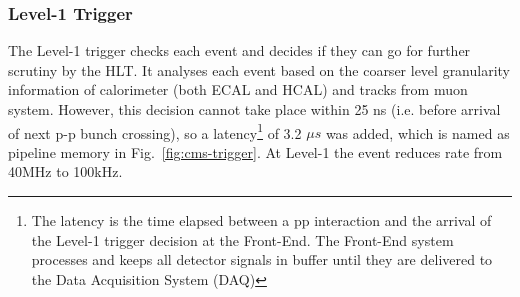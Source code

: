 \subsubsection{Level-1 Trigger} %
\label{ssub:level_1_trigger}
The Level-1 trigger checks each event and decides if they can go for further scrutiny by the HLT. It analyses each event based on the coarser level granularity information of calorimeter (both ECAL and HCAL) and tracks from muon system. However, this decision cannot take place within 25 ns (i.e. before arrival of next p-p bunch crossing), so a latency\footnote{The latency is the time elapsed between a pp interaction and the arrival of the Level-1 trigger decision at the Front-End. The Front-End system processes and keeps all detector signals in buffer until they are delivered to the Data Acquisition System (DAQ)} of 3.2 $\mu s$ was added, which is named as pipeline memory in Fig.~\ref{fig:cms-trigger}. At Level-1 the event reduces rate from 40MHz to 100kHz.

